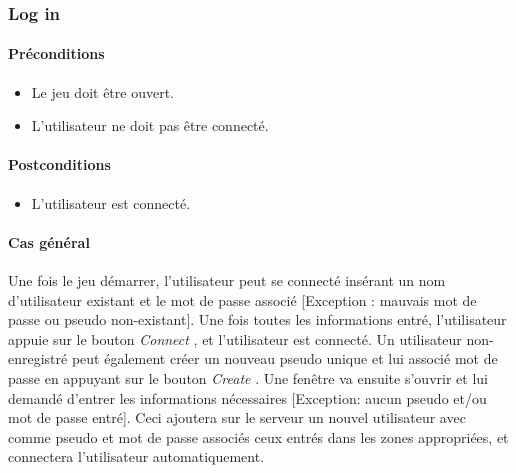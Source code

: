 \documentclass[a4paper,11pt]{report}
\begin{document}
\subsubsection{Log in}
\paragraph{Préconditions}
\begin{itemize}
 \item Le jeu doit être ouvert.
 \item L'utilisateur ne doit pas être connecté.
\end{itemize}
\paragraph{Postconditions}
\begin{itemize}
 \item L'utilisateur est connecté.
\end{itemize}
\paragraph{Cas général}
Une fois le jeu démarrer, l'utilisateur peut se connecté insérant un nom d'utilisateur existant et le mot de passe associé
[Exception : mauvais mot de passe ou pseudo non-existant].
Une fois toutes les informations entré, l'utilisateur appuie sur le bouton \og \textit{Connect} \fg, et l'utilisateur est
connecté. Un utilisateur non-enregistré peut également créer un nouveau pseudo unique
et lui associé mot de passe en appuyant sur le bouton \og \textit{Create} .
Une fenêtre va ensuite s'ouvrir et lui demandé d'entrer les informations nécessaires 
[Exception: aucun pseudo et/ou mot de passe entré]. Ceci ajoutera sur le serveur un nouvel utilisateur avec comme
pseudo et mot de passe associés ceux entrés dans les zones appropriées, et connectera l'utilisateur automatiquement.
\end{document}

